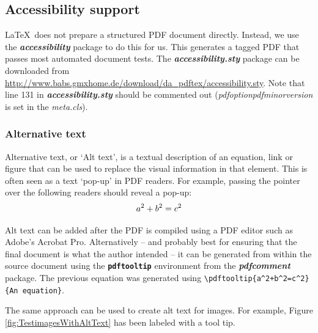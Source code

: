 \documentclass[12pt,letterpaper]{article}
\newcommand{\fn}[1]{\emph{#1}}
\newcommand{\packagename}[1]{\textbf{\emph{#1}}}
\newcommand{\envname}[1]{\textbf{\texttt{#1}}}
\begin{document}
\subsection{Accessibility support}
\LaTeX\ does not prepare a structured PDF document directly. Instead, we use the \packagename{accessibility} package to do this for us. This generates a tagged PDF that passes most automated document tests. The \packagename{accessibility.sty} package can be downloaded from \href{http://www.babs.gmxhome.de/download/da_pdftex/accessibility.sty}{http://www.babs.gmxhome.de/download/da\_pdftex/accessibility.sty}. Note that line 131 in \packagename{accessibility.sty} should be commented out (\fn{pdfoptionpdfminorversion} is set in the \fn{meta.cls}).

\subsubsection{Alternative text}\label{sec:Alttext}
Alternative text, or `Alt text', is a textual description of an equation, link or figure that can be used to replace the visual information in that element. This is often seen as a text `pop-up' in PDF readers. For example, passing the pointer over the following readers should reveal a pop-up:
\begin{equation}
\pdftooltip{a^2+b^2=c^2}{An equation}
\end{equation}

Alt text can be added after the PDF is compiled using a PDF editor such as Adobe's Acrobat Pro. Alternatively -- and probably best for ensuring that the final document is what the author intended -- it can be generated from within the source document using the \envname{pdftooltip} environment from the \packagename{pdfcomment} package. The previous equation was generated using \verb?\pdftooltip{a^2+b^2=c^2}{An equation}?.

The same approach can be used to create alt text for images. For example, Figure \ref{fig:TestimagesWithAltText} has been labeled with a tool tip. 
\end{document}
